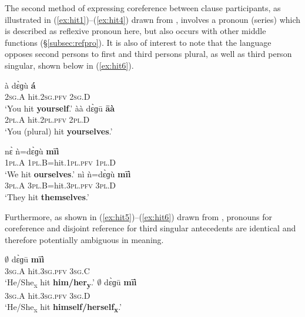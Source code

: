 \documentclass[output=paper]{langscibook}
\begin{document}
The second method of expressing coreference between clause participants, as illustrated in (\ref{ex:hit1})--(\ref{ex:hit4}) drawn from \cite[438]{HantganHeath2018}, involves a pronoun (series) which is described as reflexive pronoun here, but also occurs with other middle functions (\S \ref{subsec:refpro}). It is also of interest to note that the language opposes second persons to first and third persons plural, as well as third person singular, shown below in (\ref{ex:hit6}).
\begin{multicols}{2}
	\ea \label{ex:hit1}
	\gll 
	à dɛ̀ɡù \textbf{á} \\
	2\textsc{sg}.A hit.2\textsc{sg}.\textsc{pfv} 2\textsc{sg}.D \\
	\glt `You hit \textbf{yourself}.'
	\z
	\ea \label{ex:hit2}
	\gll àà dɛ̀ɡū \textbf{āà} \\
	2\textsc{pl}.A hit.2\textsc{pl}.\textsc{pfv} 2\textsc{pl}.D \\
	\glt `You (plural) hit \textbf{yourselves}.'
	\z
\end{multicols}
\begin{multicols}{2}
	\ea \label{ex:hit3}
	\gll 
	nɛ̀ ǹ=dɛ̀ɡù \textbf{mīì} \\
	1\textsc{pl}.A 1\textsc{pl}.B=hit.1\textsc{pl}.\textsc{pfv} 1\textsc{pl}.D \\
	\glt `We hit \textbf{ourselves}.'
	\z
	\ea \label{ex:hit4}
	\gll 
	nì ǹ=dɛ̀ɡù \textbf{mīì} \\
	3\textsc{pl}.A 3\textsc{pl}.B=hit.3\textsc{pl}.\textsc{pfv} 3\textsc{pl}.D \\
	\glt `They hit \textbf{themselves}.'
	\z
\end{multicols}
Furthermore, as shown in (\ref{ex:hit5})--(\ref{ex:hit6}) drawn from \cite[401]{HantganHeath2018}, pronouns for coreference and disjoint reference for third singular antecedents are identical and therefore potentially ambiguous in meaning.
\begin{multicols}{2}
	\ea \label{ex:hit5}
	\gll 
	$\emptyset$ dɛ̀ɡū \textbf{mīì} \\
	3\textsc{sg}.A hit.3\textsc{sg}.\textsc{pfv} 3\textsc{sg}.C \\
	\glt `He/She\textsubscript{x} hit \textbf{him/her\textsubscript{y}}.'
	\z
	\ea \label{ex:hit6}
	\gll 
	$\emptyset$ dɛ̀ɡū \textbf{mīì} \\
	3\textsc{sg}.A hit.3\textsc{sg}.\textsc{pfv} 3\textsc{sg}.D \\
	\glt `He/She\textsubscript{x} hit \textbf{himself/herself\textsubscript{x}}.' 
	\z
\end{multicols}
\end{document}

